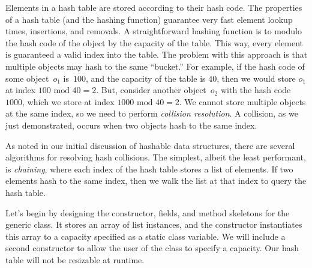 
Elements in a hash table are stored according to their hash code. 
The properties of a hash table (and the hashing function) guarantee very fast element lookup times, insertions, and removals. 
A straightforward hashing function is to modulo the hash code of the object by the capacity of the table. 
This way, every element is guaranteed a valid index into the table. 
The problem with this approach is that multiple objects may hash to the same ``bucket.'' 
For example, if the hash code of some object~$o_1$ is~$100$, and the capacity of the table is $40$, then we would store $o_1$ at index $100 \text{ mod } 40 = 2$. 
But, consider another object~$o_2$ with the hash code~$1000$, which we store at index $1000 \text{ mod } 40 = 2$. 
We cannot store multiple objects at the same index, so we need to perform \emph{collision resolution}. 
A collision, as we just demonstrated, occurs when two objects hash to the same index. 

As noted in our initial discussion of hashable data structures, there are several algorithms for resolving hash collisions. The simplest, albeit the least performant, is \emph{chaining}, where each index of the hash table stores a list of elements. If two elements hash to the same index, then we walk the list at that index to query the hash table. 

Let's begin by designing the constructor, fields, and method skeletons for the generic  class. It stores an array of list instances, and the constructor instantiates this array to a capacity specified as a static class variable. We will include a second constructor to allow the user of the class to specify a capacity. Our hash table will not be resizable at runtime.


